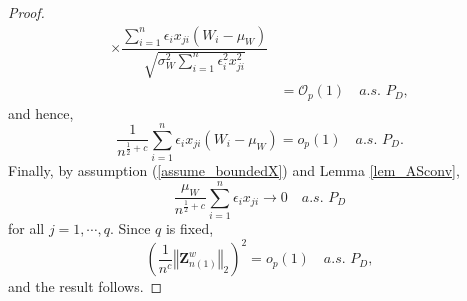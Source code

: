 \documentclass[ejs,authoryear,linksfromyear]{imsart}
\newcommand{\sumin}{\sum_{i=1}^n} %
\newcommand{\znwa}{\bm{Z}_{n(1)}^w}
\numberwithin{equation}{section}
\theoremstyle{plain}
\begin{document}
\begin{proof}
\begin{align*}
	\times \dfrac{ \sumin \epsilon_i x_{ji} (W_i - \mu_W) }
	{ \sqrt{ \sigma_W^2 \sumin \epsilon_i^2 x_{ji}^2 } } \\
	&=\mathcal{O}_p(1) \quad a.s. \,\, P_D,
	\end{align*}
	and hence,
	$$
	\dfrac{1}{n^{\frac{1}{2}+c}} \sumin \epsilon_i x_{ji} (W_i - \mu_W) 
	= o_p(1) \quad a.s. \,\, P_D.
	$$
	Finally, by assumption (\ref{assume_boundedX}) and Lemma \ref{lem_ASconv},
	$$
	\dfrac{\mu_W}{n^{\frac{1}{2}+c}} \sumin \epsilon_i x_{ji}
	\to 0 \quad a.s. \,\, P_D 
	$$
	for all $j = 1, \cdots, q$. Since $q$ is fixed,
	$$
	\left(
		\dfrac{1}{n^c}
		\left\Vert 
			\znwa
		\right\Vert_2
	\right)^2
	= o_p(1) \quad a.s. \,\, P_D,
	$$ 
	and the result follows.
	

\end{proof}
\end{document}
